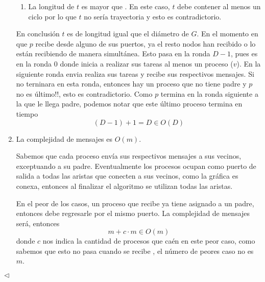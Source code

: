 \begin{enumerate}
\begin{enumerate}
       \item La longitud de $t$ es mayor que . En este
       caso, $t$ debe contener al menos un ciclo por lo que $t$ no
       sería trayectoria y esto es contradictorio.
       \end{enumerate}
       En conclusión $t$ es  de longitud igual que el diámetro de
       $G$. En el momento en que $p$ recibe  desde
       alguno de sus puertos, ya el resto nodos han recibido
        o lo están recibiendo de manera simultánea.
       Esto pasa en la ronda $D -1$, pues es en la ronda $0$ donde
       inicia a realizar sus tareas al menos un proceso ($v$).
       En la siguiente ronda envia realiza sus tareas y recibe
       sus respectivos mensajes. Si no terninara en esta ronda,
       entonces hay un proceso que no tiene padre y $p$ no es
       último!!, esto es contradictorio. Como $p$ termina en la
       ronda siguiente a la que le llega padre, podemos notar
       que este último proceso termina en tiempo
       \[(D - 1) + 1 = D \in O(D)\]
       
       
       
       \item La complejidad de mensajes es $O(m)$. \newline
              
       Sabemos que cada proceso envía sus respectivos mensajes
       a sus vecinos, exceptuando a su padre. Eventualmente
       los procesos ocupan como puerto de salida a todas las
       aristas que conecten a sus vecinos, como la gráfica es
       conexa, entonces al finalizar el algoritmo se utilizan
       todas las aristas.

       En el peor de los casos, un proceso que recibe 
       ya tiene asignado a un padre, entonces debe regresarle
        por el mismo puerto. La complejidad de mensajes
       será, entonces
       \[m + c \cdot m \in O(m)\]
       donde $c$ nos indica la cantidad de procesos que caén en este
       peor caso, como sabemos que esto no pasa cuando se recibe
       , el número de peores caso no es $m$.
       
       \end{enumerate}

\hfill $\lhd$
